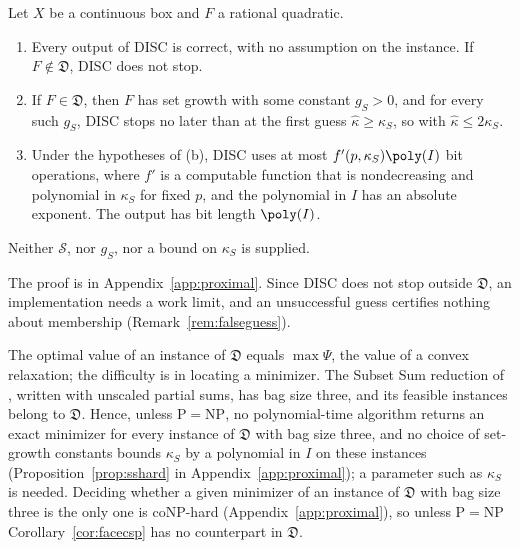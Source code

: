 \begin{theorem}\label{thm:diagdiscovery}
Let $X$ be a continuous box and $F$ a rational quadratic.
\begin{enumerate}[label=(\alph*)]
\item Every output of DISC is correct, with no assumption on the instance.
If $F\notin\mathfrak D$, DISC does not stop.
\item If $F\in\mathfrak D$, then $F$ has set growth with some constant
$g_S>0$, and for every such $g_S$, DISC stops no later than at the first
guess $\hat\kappa\ge\kappa_S$, so with $\hat\kappa\le2\kappa_S$.
\item Under the hypotheses of (b), DISC uses at most $f'(p,\kappa_S)\poly(I)$
bit operations, where $f'$ is a computable function that is nondecreasing
and polynomial in $\kappa_S$ for fixed $p$, and the polynomial in $I$ has an
absolute exponent. The output has bit length $\poly(I)$.
\end{enumerate}
Neither $\mathcal S$, nor $g_S$, nor a bound on $\kappa_S$ is supplied.
\end{theorem}

The proof is in Appendix~\ref{app:proximal}. Since DISC does not stop outside
$\mathfrak D$, an implementation needs a work limit, and an unsuccessful guess
certifies nothing about membership (Remark~\ref{rem:falseguess}).

The optimal value of an instance of $\mathfrak D$ equals $\max\Psi$, the
value of a convex relaxation; the difficulty is in locating a minimizer. The
Subset Sum reduction of \cite[Remark~2]{DelPiaKhajavirad2026}, written with
unscaled partial sums, has bag size three, and its feasible instances belong
to $\mathfrak D$. Hence, unless $\mathrm P=\mathrm{NP}$, no polynomial-time
algorithm returns an exact minimizer for every instance of $\mathfrak D$ with
bag size three, and no choice of set-growth constants bounds $\kappa_S$ by a
polynomial in $I$ on these instances (Proposition~\ref{prop:sshard} in
Appendix~\ref{app:proximal}); a parameter such as $\kappa_S$ is needed.
Deciding whether a given minimizer of an instance of $\mathfrak D$ with bag
size three is the only one is coNP-hard (Appendix~\ref{app:proximal}), so
unless $\mathrm P=\mathrm{NP}$ Corollary~\ref{cor:facecsp} has no counterpart
in $\mathfrak D$.
